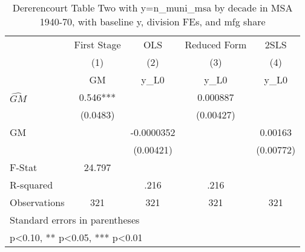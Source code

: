\begin{table}[htbp]\centering
\def\sym#1{\ifmmode^{#1}\else\(^{#1}\)\fi}
\caption{Dererencourt Table Two with y=n\_muni\_msa by decade in MSA 1940-70, with baseline y, division FEs, and mfg share}
\begin{tabular}{l*{4}{c}}
\toprule
                    & First Stage   &         OLS   &Reduced Form   &        2SLS   \\
                    &\multicolumn{1}{c}{(1)}&\multicolumn{1}{c}{(2)}&\multicolumn{1}{c}{(3)}&\multicolumn{1}{c}{(4)}\\
                    &\multicolumn{1}{c}{GM}&\multicolumn{1}{c}{y\_L0}&\multicolumn{1}{c}{y\_L0}&\multicolumn{1}{c}{y\_L0}\\
\midrule
$\hat{GM}$          &       0.546***&               &    0.000887   &               \\
                    &    (0.0483)   &               &   (0.00427)   &               \\
\addlinespace
GM                  &               &  -0.0000352   &               &     0.00163   \\
                    &               &   (0.00421)   &               &   (0.00772)   \\
\midrule
F-Stat              &      24.797   &               &               &               \\
R-squared           &               &        .216   &        .216   &               \\
Observations        &         321   &         321   &         321   &         321   \\
\bottomrule
\multicolumn{5}{l}{\footnotesize Standard errors in parentheses}\\
\multicolumn{5}{l}{\footnotesize * p<0.10, ** p<0.05, *** p<0.01}\\
\end{tabular}
\end{table}
